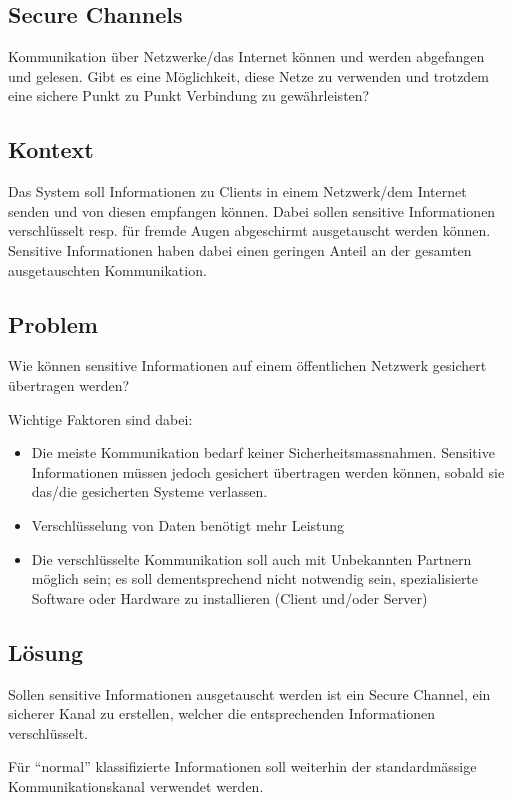 \subsection{Secure Channels}
Kommunikation über Netzwerke/das Internet können und werden abgefangen und gelesen. Gibt es eine Möglichkeit, diese Netze zu verwenden und trotzdem eine sichere Punkt zu Punkt Verbindung zu gewährleisten?

\subsection*{Kontext}
Das System soll Informationen zu Clients in einem Netzwerk/dem Internet senden und von diesen empfangen können. Dabei sollen sensitive Informationen verschlüsselt resp. für fremde Augen abgeschirmt ausgetauscht werden können. Sensitive Informationen haben dabei einen geringen Anteil an der gesamten ausgetauschten Kommunikation.

\subsection*{Problem}
Wie können sensitive Informationen auf einem öffentlichen Netzwerk gesichert übertragen werden?

Wichtige Faktoren sind dabei:

\begin{itemize}
	\item Die meiste Kommunikation bedarf keiner Sicherheitsmassnahmen. Sensitive Informationen müssen jedoch gesichert übertragen werden können, sobald sie das/die gesicherten Systeme verlassen.
	\item Verschlüsselung von Daten benötigt mehr Leistung
	\item Die verschlüsselte Kommunikation soll auch mit Unbekannten Partnern möglich sein; es soll dementsprechend nicht notwendig sein, spezialisierte Software oder Hardware zu installieren (Client und/oder Server)
\end{itemize}

\subsection*{Lösung}
Sollen sensitive Informationen ausgetauscht werden ist ein Secure Channel, ein sicherer Kanal zu erstellen, welcher die entsprechenden Informationen verschlüsselt.

Für ``normal'' klassifizierte Informationen soll weiterhin der standardmässige Kommunikationskanal verwendet werden.

